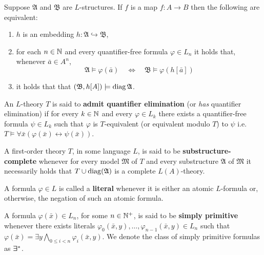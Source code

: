 \begin{lem}\label{lem:diag}
	Suppose $\mathfrak{A}$ and $\mathfrak{B}$ are $L$-structures.  If $f$ is a map $f\colon A\to B$ then the following are equivalent:
	\begin{enumerate}
		\item	$h$ is an embedding $h\colon\mathfrak{A}\hookrightarrow\mathfrak{B}$,
		\item	for each $n\in\mathbb{N}$ and every quantifier-free formula $\varphi\in L_n$ it holds that, whenever $\bar{a}\in A^n$,
		      \begin{equation}
			      \mathfrak{A}\models\varphi(\bar{a}) \quad\iff\quad \mathfrak{B}\models\varphi(h[\bar{a}])
		      \end{equation}
		\item	it holds that that $(\mathfrak{B},h[A])\models\operatorname{diag}\mathfrak{A}$.
	\end{enumerate}
\end{lem}

\begin{dfn}
	An $L$-theory $T$ is said to \textbf{admit quantifier elimination} (or \textit{has} quantifier elimination) if for every $k\in\mathbb{N}$ and every $\varphi\in L_k$ there exists a quantifier-free formula $\psi\in L_k$ such that $\varphi$ is $T$-equivalent (or equivalent modulo $T$) to $\psi$ i.e.\ $T\models\forall\bar{x}(\varphi(\bar{x})\leftrightarrow\psi(\bar{x}))$.
\end{dfn}

\begin{dfn}
	A first-order theory $T$, in some language $L$, is said to be \textbf{substructure-complete} whenever for every model $\mathfrak{M}$ of $T$ and every substructure $\mathfrak{A}$ of $\mathfrak{M}$ it necessarily holds that $T\cup\operatorname{diag}(\mathfrak{A})$ is a complete $L(A)$-theory.
\end{dfn}

\begin{dfn}[Literal]
	A formula $\varphi\in L$ is called a \textbf{literal} whenever it is either an atomic $L$-formula or, otherwise, the negation of such an atomic formula.
\end{dfn}

\begin{dfn}
	A formula $\varphi(\bar{x})\in L_n$, for some $n\in\mathbb{N}^{+}$, is said to be \textbf{simply primitive} whenever there exists literals $\varphi_0(\bar{x},y),\dotsc,\varphi_{n-1}(\bar{x},y)\in L_n$ such that $\varphi(\bar{x})=\exists y\bigwedge_{0\leq i<n}\varphi_i(\bar{x},y)$.  We denote the class of simply primitive formulas as $\bm{\exists}_{}^\ast$.
\end{dfn}

